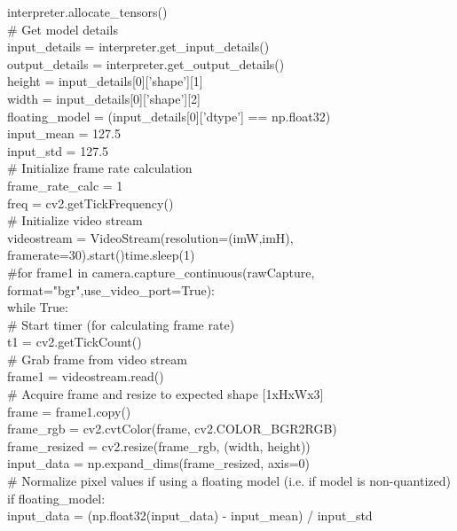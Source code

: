 interpreter.allocate\_tensors()\\

\# Get model details\\
input\_details = interpreter.get\_input\_details()\\
output\_details = interpreter.get\_output\_details()\\
height = input\_details[0]['shape'][1]\\
width = input\_details[0]['shape'][2]\\

floating\_model = (input\_details[0]['dtype'] == np.float32)\\

input\_mean = 127.5\\

input\_std = 127.5\\

\# Initialize frame rate calculation\\
frame\_rate\_calc = 1\\
freq = cv2.getTickFrequency()\\

\# Initialize video stream\\
videostream = VideoStream(resolution=(imW,imH),
framerate=30).start()time.sleep(1)\\

\#for frame1 in camera.capture\_continuous(rawCapture, format="bgr",use\_video\_port=True):\\
while True:\\

    \# Start timer (for calculating frame rate)\\
    t1 = cv2.getTickCount()\\

    \# Grab frame from video stream\\
    frame1 = videostream.read()\\

    \# Acquire frame and resize to expected shape [1xHxWx3]\\
    frame = frame1.copy()\\
    frame\_rgb = cv2.cvtColor(frame, cv2.COLOR\_BGR2RGB)\\
    frame\_resized = cv2.resize(frame\_rgb, (width, height))\\
    input\_data = np.expand\_dims(frame\_resized, axis=0)\\

    \# Normalize pixel values if using a floating model (i.e. if model is non-quantized)\\
    if floating\_model:\\
        input\_data = (np.float32(input\_data) - input\_mean) / input\_std\\


